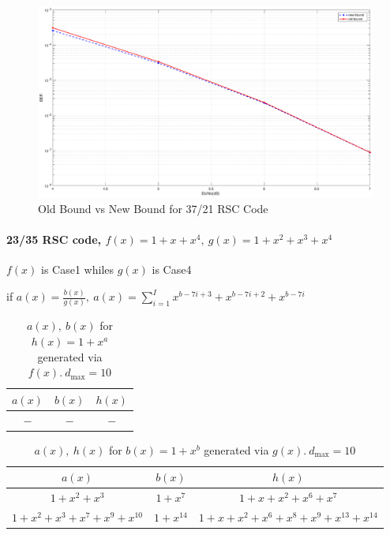 \documentclass[11pt, oneside, dvipdfmx]{book}
\begin{document}
\begin{figure}[h]
\centering
		\includegraphics[width=\textwidth]{./Images/RSC_37_21.eps}
		\caption{Old Bound vs New Bound for 37/21 RSC Code}
		\label{fig2}
		\end{figure}
\newpage
\paragraph{23/35 RSC code, $f(x)=1+x+x^4,~g(x)=1+x^2+x^3+x^4$ \newline}
$f(x)$ is Case1 whiles $g(x)$ is Case4

if $a(x)=\frac{b(x)}{g(x)},~a(x)=\sum_{i=1}^{I}x^{b-7i+3}+x^{b-7i+2}+x^{b-7i}$

\begin{table}[h!]
 \caption{$a(x),~b(x)$ for $h(x)=1+x^a$ generated via $f(x).~d_{\text{max}}=10$}
\centering
 \begin{tabular}{c c c} 
 \hline
 $a(x)$ & $b(x)$ & $h(x)$ \\ [0.5ex] 
 \hline\hline
$~-~$ & $~-~$ & $~-~$\\

 \end{tabular}
 \label{Tab5}
\end{table}

 \begin{table}[h!]
 \caption{$a(x),~h(x)$ for $b(x)=1+x^b$ generated via $g(x).~d_{\text{max}}=10$}
\centering
 \begin{tabular}{c c c} 
 \hline
 $a(x)$ & $b(x)$ & $h(x)$ \\ [0.5ex] 
 \hline\hline
$1+x^2+x^3$ & $1+x^{7}$ & $1+x+x^2+x^6+x^7$\\
\hline
$1+x^2+x^3+x^7+x^9+x^{10}$ & $1+x^{14}$ & $1+x+x^2+x^6+x^8+x^9+x^{13}+x^{14}$\\
 \end{tabular}
 \label{Tab6}
\end{table}
\end{document}
